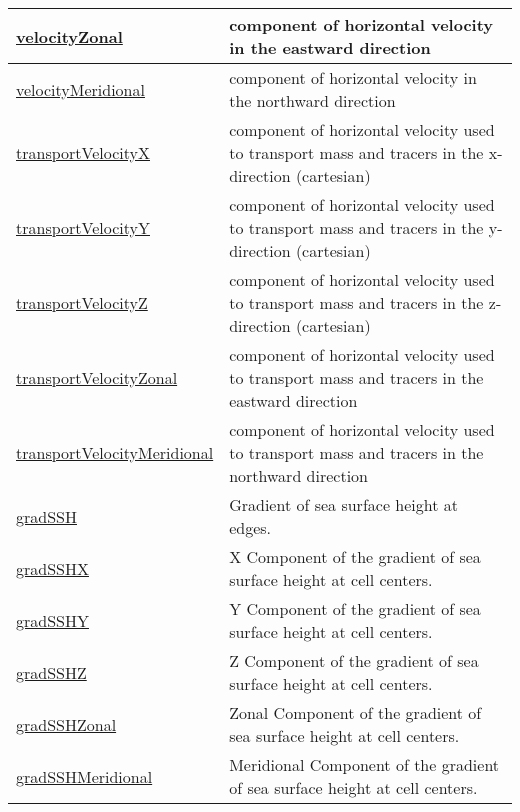 {\begin{center}
\begin{longtable}{| p{2.0in} | p{4.0in} |}
    \hline
    \hyperref[subsec:var_sec_diagnostics_velocityZonal]{velocityZonal} & component of horizontal velocity in the eastward direction \\
    \hline
    \hyperref[subsec:var_sec_diagnostics_velocityMeridional]{velocityMeridional} & component of horizontal velocity in the northward direction \\
    \hline
    \hyperref[subsec:var_sec_diagnostics_transportVelocityX]{transportVelocityX} & component of horizontal velocity used to transport mass and tracers in the x-direction (cartesian) \\
    \hline
    \hyperref[subsec:var_sec_diagnostics_transportVelocityY]{transportVelocityY} & component of horizontal velocity used to transport mass and tracers in the y-direction (cartesian) \\
    \hline
    \hyperref[subsec:var_sec_diagnostics_transportVelocityZ]{transportVelocityZ} & component of horizontal velocity used to transport mass and tracers in the z-direction (cartesian) \\
    \hline
    \hyperref[subsec:var_sec_diagnostics_transportVelocityZonal]{transportVelocityZonal} & component of horizontal velocity used to transport mass and tracers in the eastward direction \\
    \hline
    \hyperref[subsec:var_sec_diagnostics_transportVelocityMeridional]{transportVelocityMeridional} & component of horizontal velocity used to transport mass and tracers in the northward direction \\
    \hline
    \hyperref[subsec:var_sec_diagnostics_gradSSH]{gradSSH} & Gradient of sea surface height at edges. \\
    \hline
    \hyperref[subsec:var_sec_diagnostics_gradSSHX]{gradSSHX} & X Component of the gradient of sea surface height at cell centers. \\
    \hline
    \hyperref[subsec:var_sec_diagnostics_gradSSHY]{gradSSHY} & Y Component of the gradient of sea surface height at cell centers. \\
    \hline
    \hyperref[subsec:var_sec_diagnostics_gradSSHZ]{gradSSHZ} & Z Component of the gradient of sea surface height at cell centers. \\
    \hline
    \hyperref[subsec:var_sec_diagnostics_gradSSHZonal]{gradSSHZonal} & Zonal Component of the gradient of sea surface height at cell centers. \\
    \hline
    \hyperref[subsec:var_sec_diagnostics_gradSSHMeridional]{gradSSHMeridional} & Meridional Component of the gradient of sea surface height at cell centers. \\

\end{longtable}
\end{center}}
